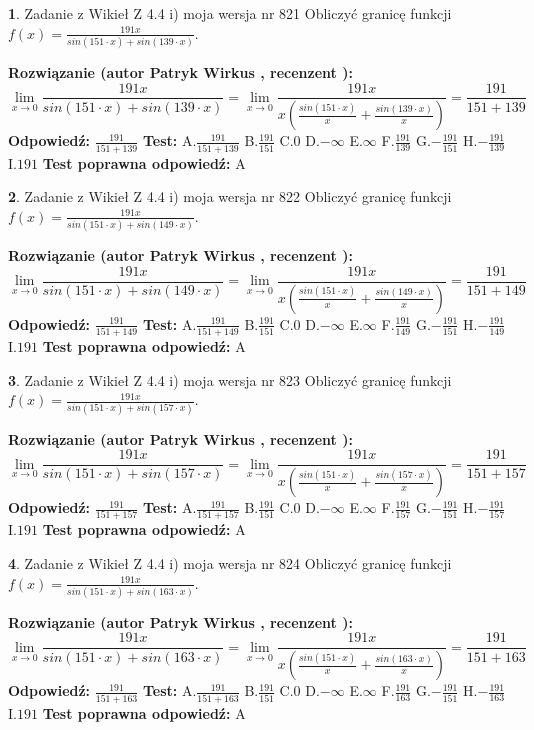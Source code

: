 \documentclass[12pt, a4paper]{article}
\theoremstyle{definition} %
\newtheorem{zad}{}
\newcommand{\zadStart}[1]{\begin{zad}#1\newline}
\newcommand{\zadStop}{\end{zad}}
\newcommand{\rozwStart}[2]{\noindent \textbf{Rozwiązanie (autor #1 , recenzent #2): }\newline}
\newcommand{\rozwStop}{\newline}
\newcommand{\odpStart}{\noindent \textbf{Odpowiedź:}\newline}
\newcommand{\odpStop}{\newline}
\newcommand{\testStart}{\noindent \textbf{Test:}\newline}
\newcommand{\testStop}{\newline}
\newcommand{\kluczStart}{\noindent \textbf{Test poprawna odpowiedź:}\newline}
\newcommand{\kluczStop}{\newline}
\begin{document}
\zadStart{Zadanie z Wikieł Z 4.4 i) moja wersja nr 821}
Obliczyć granicę funkcji $f(x)=\frac{191x}{sin(151\cdot x) +sin(139\cdot x)}$.
\zadStop
\rozwStart{Patryk Wirkus}{}
$$\lim\limits_{x\to 0}\frac{191x}{sin(151\cdot x) +sin(139\cdot x)}=\lim\limits_{x\to 0}\frac{191x}{x(\frac{sin(151\cdot x)}{x}+\frac{sin(139\cdot x)}{x})}=\frac{191}{151+139}$$
\rozwStop
\odpStart
$\frac{191}{151+139}$
\odpStop
\testStart
A.$\frac{191}{151+139}$
B.$\frac{191}{151}$
C.$0$
D.$-\infty$
E.$\infty$
F.$\frac{191}{139}$
G.$-\frac{191}{151}$
H.$-\frac{191}{139}$
I.$191$
\testStop
\kluczStart
A
\kluczStop



\zadStart{Zadanie z Wikieł Z 4.4 i) moja wersja nr 822}
Obliczyć granicę funkcji $f(x)=\frac{191x}{sin(151\cdot x) +sin(149\cdot x)}$.
\zadStop
\rozwStart{Patryk Wirkus}{}
$$\lim\limits_{x\to 0}\frac{191x}{sin(151\cdot x) +sin(149\cdot x)}=\lim\limits_{x\to 0}\frac{191x}{x(\frac{sin(151\cdot x)}{x}+\frac{sin(149\cdot x)}{x})}=\frac{191}{151+149}$$
\rozwStop
\odpStart
$\frac{191}{151+149}$
\odpStop
\testStart
A.$\frac{191}{151+149}$
B.$\frac{191}{151}$
C.$0$
D.$-\infty$
E.$\infty$
F.$\frac{191}{149}$
G.$-\frac{191}{151}$
H.$-\frac{191}{149}$
I.$191$
\testStop
\kluczStart
A
\kluczStop



\zadStart{Zadanie z Wikieł Z 4.4 i) moja wersja nr 823}
Obliczyć granicę funkcji $f(x)=\frac{191x}{sin(151\cdot x) +sin(157\cdot x)}$.
\zadStop
\rozwStart{Patryk Wirkus}{}
$$\lim\limits_{x\to 0}\frac{191x}{sin(151\cdot x) +sin(157\cdot x)}=\lim\limits_{x\to 0}\frac{191x}{x(\frac{sin(151\cdot x)}{x}+\frac{sin(157\cdot x)}{x})}=\frac{191}{151+157}$$
\rozwStop
\odpStart
$\frac{191}{151+157}$
\odpStop
\testStart
A.$\frac{191}{151+157}$
B.$\frac{191}{151}$
C.$0$
D.$-\infty$
E.$\infty$
F.$\frac{191}{157}$
G.$-\frac{191}{151}$
H.$-\frac{191}{157}$
I.$191$
\testStop
\kluczStart
A
\kluczStop



\zadStart{Zadanie z Wikieł Z 4.4 i) moja wersja nr 824}
Obliczyć granicę funkcji $f(x)=\frac{191x}{sin(151\cdot x) +sin(163\cdot x)}$.
\zadStop
\rozwStart{Patryk Wirkus}{}
$$\lim\limits_{x\to 0}\frac{191x}{sin(151\cdot x) +sin(163\cdot x)}=\lim\limits_{x\to 0}\frac{191x}{x(\frac{sin(151\cdot x)}{x}+\frac{sin(163\cdot x)}{x})}=\frac{191}{151+163}$$
\rozwStop
\odpStart
$\frac{191}{151+163}$
\odpStop
\testStart
A.$\frac{191}{151+163}$
B.$\frac{191}{151}$
C.$0$
D.$-\infty$
E.$\infty$
F.$\frac{191}{163}$
G.$-\frac{191}{151}$
H.$-\frac{191}{163}$
I.$191$
\testStop
\kluczStart
A
\kluczStop
\end{document}
